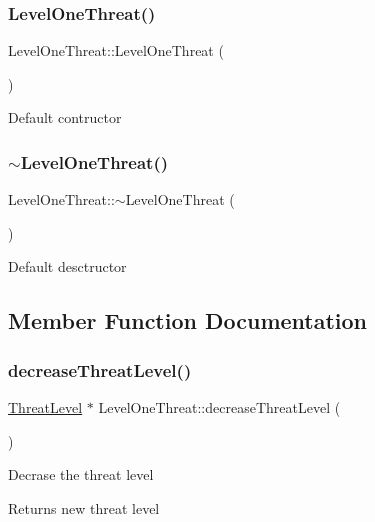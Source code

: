 \subsubsection{\texorpdfstring{Level\+One\+Threat()}{LevelOneThreat()}}
{\footnotesize\ttfamily Level\+One\+Threat\+::\+Level\+One\+Threat (\begin{DoxyParamCaption}{ }\end{DoxyParamCaption})}

Default contructor \mbox{\label{classLevelOneThreat_a1c6e77c98473057eef8fe66f0e325fcf}} 
\subsubsection{\texorpdfstring{$\sim$\+Level\+One\+Threat()}{~LevelOneThreat()}}
{\footnotesize\ttfamily Level\+One\+Threat\+::$\sim$\+Level\+One\+Threat (\begin{DoxyParamCaption}{ }\end{DoxyParamCaption})}

Default desctructor 

\subsection{Member Function Documentation}
\mbox{\label{classLevelOneThreat_a9a2899ac02e075905671ea03374cd561}} 
\subsubsection{\texorpdfstring{decrease\+Threat\+Level()}{decreaseThreatLevel()}}
{\footnotesize\ttfamily \hyperlink{classThreatLevel}{Threat\+Level} $\ast$ Level\+One\+Threat\+::decrease\+Threat\+Level (\begin{DoxyParamCaption}{ }\end{DoxyParamCaption})\hspace{0.3cm}{\ttfamily [virtual]}}

Decrase the threat level \begin{DoxyReturn}{Returns}
new threat level 
\end{DoxyReturn}


